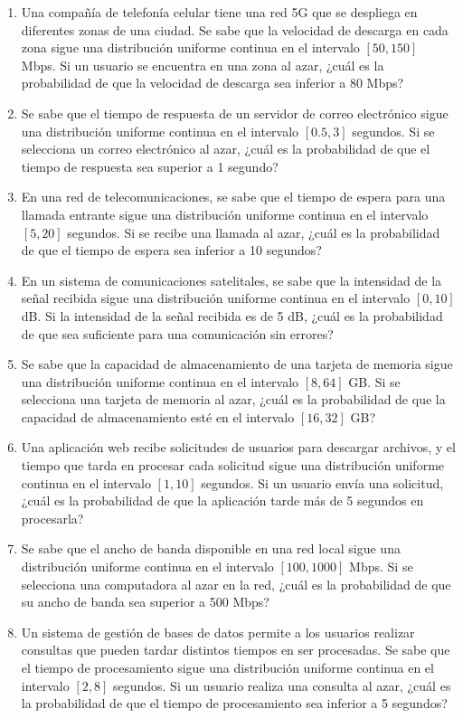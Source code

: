 \begin{Ejer}
\begin{enumerate}
    \item Una compañía de telefonía celular tiene una red 5G que se despliega en diferentes zonas de una ciudad. Se sabe que la velocidad de descarga en cada zona sigue una distribución uniforme continua en el intervalo $[50, 150]$ Mbps. Si un usuario se encuentra en una zona al azar, ¿cuál es la probabilidad de que la velocidad de descarga sea inferior a 80 Mbps?

    \item Se sabe que el tiempo de respuesta de un servidor de correo electrónico sigue una distribución uniforme continua en el intervalo $[0.5, 3]$ segundos. Si se selecciona un correo electrónico al azar, ¿cuál es la probabilidad de que el tiempo de respuesta sea superior a 1 segundo?

    \item En una red de telecomunicaciones, se sabe que el tiempo de espera para una llamada entrante sigue una distribución uniforme continua en el intervalo $[5, 20]$ segundos. Si se recibe una llamada al azar, ¿cuál es la probabilidad de que el tiempo de espera sea inferior a 10 segundos?

    \item En un sistema de comunicaciones satelitales, se sabe que la intensidad de la señal recibida sigue una distribución uniforme continua en el intervalo $[0, 10]$ dB. Si la intensidad de la señal recibida es de 5 dB, ¿cuál es la probabilidad de que sea suficiente para una comunicación sin errores?

    \item Se sabe que la capacidad de almacenamiento de una tarjeta de memoria sigue una distribución uniforme continua en el intervalo $[8, 64]$ GB. Si se selecciona una tarjeta de memoria al azar, ¿cuál es la probabilidad de que la capacidad de almacenamiento esté en el intervalo $[16, 32]$ GB?

    \item Una aplicación web recibe solicitudes de usuarios para descargar archivos, y el tiempo que tarda en procesar cada solicitud sigue una distribución uniforme continua en el intervalo $[1, 10]$ segundos. Si un usuario envía una solicitud, ¿cuál es la probabilidad de que la aplicación tarde más de 5 segundos en procesarla?

    \item Se sabe que el ancho de banda disponible en una red local sigue una distribución uniforme continua en el intervalo $[100, 1000]$ Mbps. Si se selecciona una computadora al azar en la red, ¿cuál es la probabilidad de que su ancho de banda sea superior a 500 Mbps?

    \item Un sistema de gestión de bases de datos permite a los usuarios realizar consultas que pueden tardar distintos tiempos en ser procesadas. Se sabe que el tiempo de procesamiento sigue una distribución uniforme continua en el intervalo $[2, 8]$ segundos. Si un usuario realiza una consulta al azar, ¿cuál es la probabilidad de que el tiempo de procesamiento sea inferior a 5 segundos?

\end{enumerate}
\end{Ejer} 



